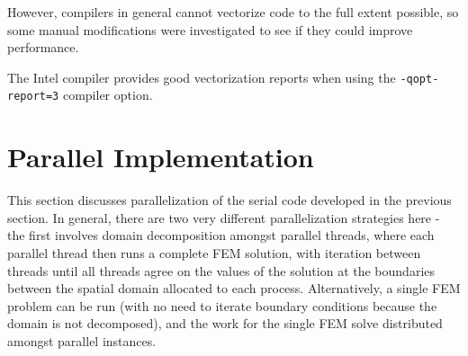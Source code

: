 \documentclass[10pt]{article}
\begin{document}
However, compilers in general cannot vectorize code to the full extent possible, so some manual modifications were investigated to see if they could improve performance. 





The Intel compiler provides good vectorization reports when using the {\tt -qopt-report=3} compiler option. 

\section{Parallel Implementation}
This section discusses parallelization of the serial code developed in the previous section. In general, there are two very different parallelization strategies here - the first involves domain decomposition amongst parallel threads, where each parallel thread then runs a complete FEM solution, with iteration between threads until all threads agree on the values of the solution at the boundaries between the spatial domain allocated to each process. Alternatively, a single FEM problem can be run (with no need to iterate boundary conditions because the domain is not decomposed), and the work for the single FEM solve distributed amongst parallel instances.
\end{document}
